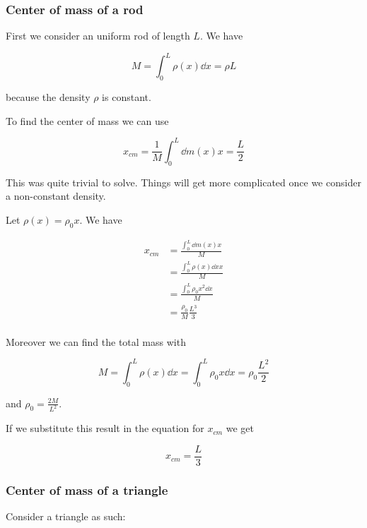 \documentclass[10pt]{extarticle}
\begin{document}
\subsubsection{Center of mass of a rod}

First we consider an uniform rod of length $L$.
We have

$$
    M = \int_0^L \rho(x) \dd{x} = \rho L
$$

because the density $\rho$ is constant.

To find the center of mass we can use

$$
    x_{cm} = \frac{1}{M} \int_0^L \dd{m}(x) x = \frac{L}{2}
$$

This was quite trivial to solve. Things will get more complicated once we consider a non-constant density.

Let $\rho(x) = \rho_0 x$. We have

\begin{align*}
    x_{cm} & = \frac{\int_0^L \dd{m}(x) x}{M}       \\
           & = \frac{\int_0^L \rho(x) \dd{x} x}{M}  \\
           & = \frac{\int_0^L \rho_0 x^2 \dd{x}}{M} \\
           & = \frac{\rho_0}{M} \frac{L^3}{3}       \\
\end{align*}

Moreover we can find the total mass with

$$
    M = \int_0^L \rho(x) \dd{x} = \int_0^L \rho_0 x \dd{x} = \rho_0 \frac{L^2}{2}
$$

and $\rho_0 = \frac{2M}{L^2}$.

If we substitute this result in the equation for $x_{cm}$ we get

$$
    x_{cm} = \frac{L}{3}
$$

\subsubsection{Center of mass of a triangle}

Consider a triangle as such:

\begin{figure}[H]
    \centering
\end{figure}
\end{document}
